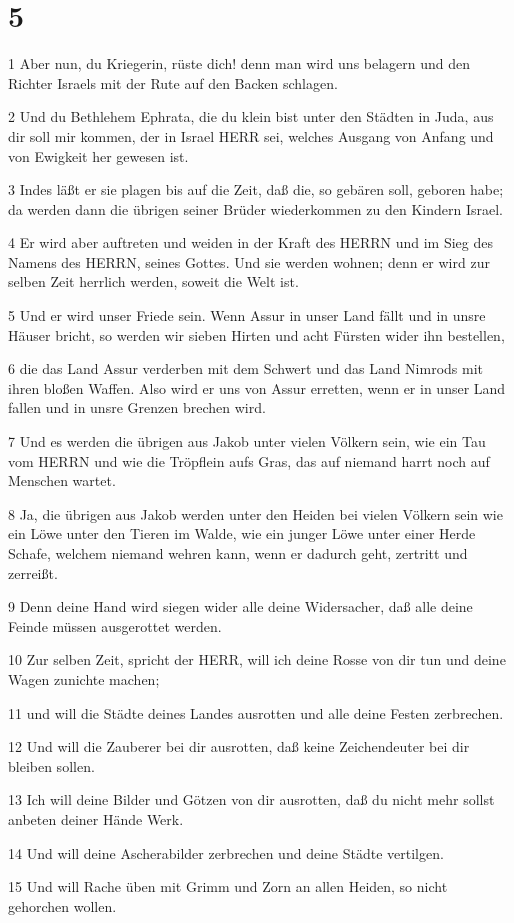 \chapter{5}

\par 1 Aber nun, du Kriegerin, rüste dich! denn man wird uns belagern und den Richter Israels mit der Rute auf den Backen schlagen.
\par 2 Und du Bethlehem Ephrata, die du klein bist unter den Städten in Juda, aus dir soll mir kommen, der in Israel HERR sei, welches Ausgang von Anfang und von Ewigkeit her gewesen ist.
\par 3 Indes läßt er sie plagen bis auf die Zeit, daß die, so gebären soll, geboren habe; da werden dann die übrigen seiner Brüder wiederkommen zu den Kindern Israel.
\par 4 Er wird aber auftreten und weiden in der Kraft des HERRN und im Sieg des Namens des HERRN, seines Gottes. Und sie werden wohnen; denn er wird zur selben Zeit herrlich werden, soweit die Welt ist.
\par 5 Und er wird unser Friede sein. Wenn Assur in unser Land fällt und in unsre Häuser bricht, so werden wir sieben Hirten und acht Fürsten wider ihn bestellen,
\par 6 die das Land Assur verderben mit dem Schwert und das Land Nimrods mit ihren bloßen Waffen. Also wird er uns von Assur erretten, wenn er in unser Land fallen und in unsre Grenzen brechen wird.
\par 7 Und es werden die übrigen aus Jakob unter vielen Völkern sein, wie ein Tau vom HERRN und wie die Tröpflein aufs Gras, das auf niemand harrt noch auf Menschen wartet.
\par 8 Ja, die übrigen aus Jakob werden unter den Heiden bei vielen Völkern sein wie ein Löwe unter den Tieren im Walde, wie ein junger Löwe unter einer Herde Schafe, welchem niemand wehren kann, wenn er dadurch geht, zertritt und zerreißt.
\par 9 Denn deine Hand wird siegen wider alle deine Widersacher, daß alle deine Feinde müssen ausgerottet werden.
\par 10 Zur selben Zeit, spricht der HERR, will ich deine Rosse von dir tun und deine Wagen zunichte machen;
\par 11 und will die Städte deines Landes ausrotten und alle deine Festen zerbrechen.
\par 12 Und will die Zauberer bei dir ausrotten, daß keine Zeichendeuter bei dir bleiben sollen.
\par 13 Ich will deine Bilder und Götzen von dir ausrotten, daß du nicht mehr sollst anbeten deiner Hände Werk.
\par 14 Und will deine Ascherabilder zerbrechen und deine Städte vertilgen.
\par 15 Und will Rache üben mit Grimm und Zorn an allen Heiden, so nicht gehorchen wollen.

